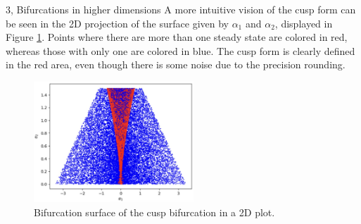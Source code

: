 \documentclass[10pt,a4paper]{article}
\begin{document}
\begin{task}{3, Bifurcations in higher dimensions}
A more intuitive vision of the cusp form can be seen in the 2D projection of the surface given by $\alpha_1$ and $\alpha_2$, displayed in Figure \ref{2dcusp}. Points where there are more than one steady state are colored in red, whereas those with only one are colored in blue. The cusp form is clearly defined in the red area, even though there is some noise due to the precision rounding.

\begin{figure}[H]
    \centering
    \includegraphics[width=6cm]{images/cusp2d.jpg}
    \caption{Bifurcation surface of the cusp bifurcation in a 2D plot.}
    \label{2dcusp}
\end{figure}

\end{task}

\newpage
\end{document}
